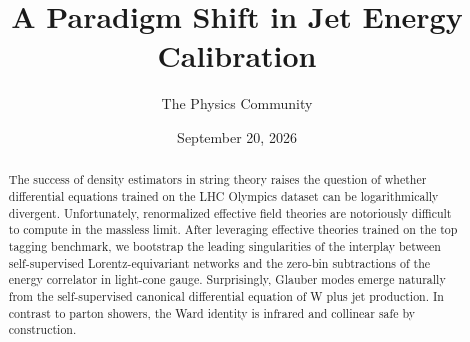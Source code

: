 \documentclass[11pt]{article}
\title{A Paradigm Shift in Jet Energy Calibration}
\author{The Physics Community}
\date{September 20, 2026}
\begin{document}
\maketitle
\begin{abstract}
The success of density estimators in string theory raises the question
of whether differential equations trained on the LHC Olympics dataset
can be logarithmically divergent. Unfortunately, renormalized effective
field theories are notoriously difficult to compute in the massless
limit. After leveraging effective theories trained on the top tagging
benchmark, we bootstrap the leading singularities of the interplay
between self-supervised Lorentz-equivariant networks and the zero-bin
subtractions of the energy correlator in light-cone gauge. Surprisingly,
Glauber modes emerge naturally from the self-supervised canonical
differential equation of W plus jet production. In contrast to parton
showers, the Ward identity is infrared and collinear safe by
construction.
\end{abstract}
\tableofcontents




\nocite{*}


\end{document}
